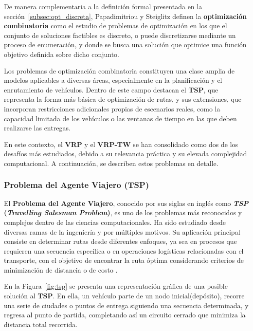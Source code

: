 \documentclass[12pt,titlepage,twoside,openright]{book}
\begin{document}
De manera complementaria a la definición formal presentada en la sección~\ref{subsec:opt_discreta}, Papadimitriou y Steiglitz \citep{papadimitriou1998} definen la \textbf{optimización combinatoria} como el estudio de problemas de optimización en los que el conjunto de soluciones factibles es discreto, o puede discretizarse mediante un proceso de enumeración, y donde se busca una solución que optimice una función objetivo definida sobre dicho conjunto.

Los problemas de optimización combinatoria constituyen una clase amplia de modelos aplicables a diversas áreas, especialmente en la planificación y el enrutamiento de vehículos. Dentro de este campo destacan el \textbf{TSP}, que representa la forma más básica de optimización de rutas, y sus extensiones, que incorporan restricciones adicionales propias de escenarios reales, como la capacidad limitada de los vehículos o las ventanas de tiempo en las que deben realizarse las entregas.

En este contexto, el \textbf{VRP} y el \textbf{VRP-TW} se han consolidado como dos de los desafíos más estudiados, debido a su relevancia práctica y su elevada complejidad computacional. A continuación, se describen estos problemas en detalle.
\subsubsection{Problema del Agente Viajero (TSP)}
\label{subsec:problem_tsp}

El \textbf{Problema del Agente Viajero}, conocido por sus siglas en inglés como \textbf{\textit{TSP} (\emph{Travelling Salesman Problem})}, es uno de los problemas más reconocidos y complejos dentro de las ciencias computacionales. Ha sido estudiado desde diversas ramas de la ingeniería y por múltiples motivos. Su aplicación principal consiste en determinar rutas desde diferentes enfoques, ya sea en procesos que requieren una secuencia específica o en operaciones logísticas relacionadas con el transporte, con el objetivo de encontrar la ruta óptima considerando criterios de minimización de distancia o de costo \citep{lopez2014tabu}.

En la Figura~\ref{fig:tsp} se presenta una representación gráfica de una posible solución al \textbf{TSP}. En ella, un vehículo parte de un nodo inicial(depósito), recorre una serie de ciudades o puntos de entrega siguiendo una secuencia determinada, y regresa al punto de partida, completando así un circuito cerrado que minimiza la distancia total recorrida.
\end{document}

